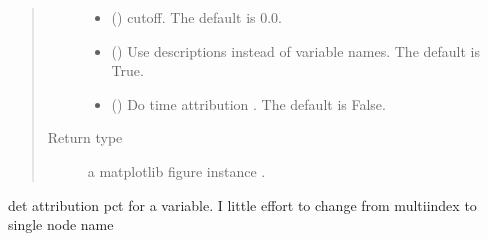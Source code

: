 \documentclass[letterpaper,10pt,english]{sphinxmanual}
\begin{document}
\begin{fulllineitems}
\begin{fulllineitems}
\begin{quote}
\begin{description}
\begin{itemize}
\item {} 
\sphinxAtStartPar
{} (\sphinxstyleliteralemphasis{\sphinxupquote{, }}) \textendash{} cutoff. The default is 0.0.

\item {} 
\sphinxAtStartPar
{} (\sphinxstyleliteralemphasis{\sphinxupquote{, }}) \textendash{} Use descriptions instead of variable names. The default is True.

\item {} 
\sphinxAtStartPar
{} (\sphinxstyleliteralemphasis{\sphinxupquote{, }}) \textendash{} Do time attribution . The default is False.

\end{itemize}

\item[{Return type}] \leavevmode
\sphinxAtStartPar
a matplotlib figure instance .

\end{description}\end{quote}

\end{fulllineitems}


\begin{fulllineitems}
\label{\detokenize{core/modelclass:modelclass.Dekomp_Mixin.get_att_pct}}
\pysigstartsignatures
{}
\pysigstopsignatures
\sphinxAtStartPar
det attribution pct for a variable.
I little effort to change from multiindex to single node name


\end{fulllineitems}
\end{fulllineitems}
\end{document}
